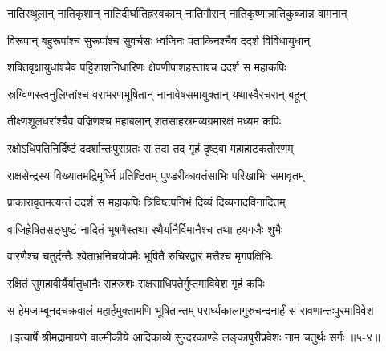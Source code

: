 \twolineshloka
{नातिस्थूलान् नातिकृशान् नातिदीर्घातिह्रस्वकान्}
{नातिगौरान् नातिकृष्णान्नातिकुब्जान्न वामनान्} %

\twolineshloka
{विरूपान् बहुरूपांश्च सुरूपांश्च सुवर्चसः}
{ध्वजिनः पताकिनश्चैव ददर्श विविधायुधान्} %

\twolineshloka
{शक्तिवृक्षायुधांश्चैव पट्टिशाशनिधारिणः}
{क्षेपणीपाशहस्तांश्च ददर्श स महाकपिः} %

\twolineshloka
{स्रग्विणस्त्वनुलिप्तांश्च वराभरणभूषितान्}
{नानावेषसमायुक्तान् यथास्वैरचरान् बहून्} %

\twolineshloka
{तीक्ष्णशूलधरांश्चैव वज्रिणश्च महाबलान्}
{शतसाहस्रमव्यग्रमारक्षं मध्यमं कपिः} %

\twolineshloka
{रक्षोऽधिपतिनिर्दिष्टं ददर्शान्तःपुराग्रतः}
{स तदा तद् गृहं दृष्ट्वा महाहाटकतोरणम्} %

\twolineshloka
{राक्षसेन्द्रस्य विख्यातमद्रिमूर्ध्नि प्रतिष्ठितम्}
{पुण्डरीकावतंसाभिः परिखाभिः समावृतम्} %

\twolineshloka
{प्राकारावृतमत्यन्तं ददर्श स महाकपिः}
{त्रिविष्टपनिभं दिव्यं दिव्यनादविनादितम्} %

\twolineshloka
{वाजिह्रेषितसङ्घुष्टं नादितं भूषणैस्तथा}
{रथैर्यानैर्विमानैश्च तथा हयगजैः शुभैः} %

\twolineshloka
{वारणैश्च चतुर्दन्तैः श्वेताभ्रनिचयोपमैः}
{भूषितै रुचिरद्वारं मत्तैश्च मृगपक्षिभिः} %

\twolineshloka
{रक्षितं सुमहावीर्यैर्यातुधानैः सहस्रशः}
{राक्षसाधिपतेर्गुप्तमाविवेश गृहं कपिः} %

\twolineshloka
{स हेमजाम्बूनदचक्रवालं महार्हमुक्तामणि भूषितान्तम्}
{परार्घ्यकालागुरुचन्दनार्हं स रावणान्तःपुरमाविवेश} %


॥इत्यार्षे श्रीमद्रामायणे वाल्मीकीये आदिकाव्ये सुन्दरकाण्डे लङ्कापुरीप्रवेशः नाम चतुर्थः सर्गः ॥५-४॥
